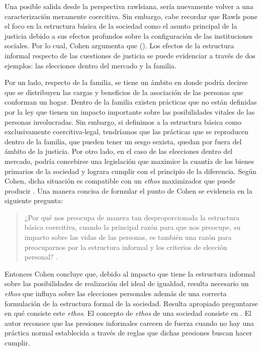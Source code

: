 Una posible salida desde la perspectiva rawlsiana, sería nuevamente volver a una caracterización meramente coercitiva. Sin embargo, cabe recordar que Rawls pone el foco en la estructura básica de la sociedad como el asunto principal de la justicia debido a sus efectos profundos sobre la configuración de las instituciones sociales. Por lo cual, Cohen argumenta que  (\citeyear[p. 187]{Cohen_2001}). Los efectos de la estructura informal respecto de las cuestiones de justicia se puede evidenciar a través de dos ejemplos: las elecciones dentro del mercado y la familia.

Por un lado, respecto de la familia, se tiene un ámbito en donde podría decirse que se distribuyen las cargas y beneficios de la asociación de las personas que conforman un hogar. Dentro de la familia existen prácticas que no están definidas por la ley que tienen un impacto importante sobre las posibilidades vitales de las personas involucradas. Sin embargo, si definimos a la estructura básica como exclusivamente coercitiva-legal, tendríamos que las prácticas que se reproducen dentro de la familia, que pueden tener un sesgo sexista, quedan por fuera del ámbito de la justicia. Por otro lado, en el caso de las elecciones dentro del mercado, podría concebirse una legislación que maximice la cuantía de los bienes primarios de la sociedad y lograra cumplir con el principio de la diferencia. Según Cohen, dicha situación es compatible con un \textit{ethos} maximizador que puede producir  \citep[p. 189]{Cohen_2001}. Una manera concisa de formular el punto de Cohen se evidencia en la siguiente pregunta: 

\vspace{3mm}
\begin{quote}
   ¿Por qué nos preocupa de manera tan desproporcionada la estructura básica coercitiva, cuando la principal razón para que nos preocupe, su impacto sobre las vidas de las personas, es también una razón para preocuparnos por la estructura informal y los criterios de elección personal? \citep[p. 190]{Cohen_2001}. 
\end{quote}
\vspace{3mm}

Entonces Cohen concluye que, debido al impacto que tiene la estructura informal sobre las posibilidades de realización del ideal de igualdad, resulta necesario un \textit{ethos} que influya sobre las elecciones personales además de una correcta formulación de la estructura formal de la sociedad. Resulta apropiado preguntarse en qué consiste este \textit{ethos}. El concepto de \textit{ethos} de una sociedad consiste en  \citep[p. 197]{Cohen_2001}. El autor reconoce que las presiones informales carecen de fuerza cuando no hay una práctica normal establecida a través de reglas que dichas presiones buscan hacer cumplir. 

